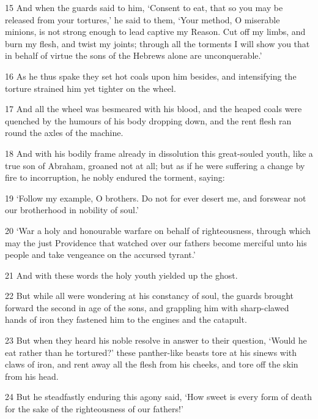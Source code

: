 \par 15 And when the guards said to him, ‘Consent to eat, that so you may be released from your tortures,’ he said to them, ‘Your method, O miserable minions, is not strong enough to lead captive my Reason. Cut off my limbs, and burn my flesh, and twist my joints; through all the torments I will show you that in behalf of virtue the sons of the Hebrews alone are unconquerable.’

\par 16 As he thus spake they set hot coals upon him besides, and intensifying the torture strained him yet tighter on the wheel.

\par 17 And all the wheel was besmeared with his blood, and the heaped coals were quenched by the humours of his body dropping down, and the rent flesh ran round the axles of the machine.

\par 18 And with his bodily frame already in dissolution this great-souled youth, like a true son of Abraham, groaned not at all; but as if he were suffering a change by fire to incorruption, he nobly endured the torment, saying:

\par 19 ‘Follow my example, O brothers. Do not for ever desert me, and forswear not our brotherhood in nobility of soul.’

\par 20 ‘War a holy and honourable warfare on behalf of righteousness, through which may the just Providence that watched over our fathers become merciful unto his people and take vengeance on the accursed tyrant.’

\par 21 And with these words the holy youth yielded up the ghost.

\par 22 But while all were wondering at his constancy of soul, the guards brought forward the second in age of the sons, and grappling him with sharp-clawed hands of iron they fastened him to the engines and the catapult.

\par 23 But when they heard his noble resolve in answer to their question, ‘Would he eat rather than he tortured?’ these panther-like beasts tore at his sinews with claws of iron, and rent away all the flesh from his cheeks, and tore off the skin from his head.

\par 24 But he steadfastly enduring this agony said, ‘How sweet is every form of death for the sake of the righteousness of our fathers!’

